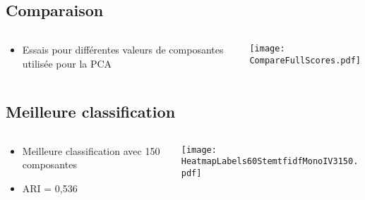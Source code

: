\documentclass[8pt,aspectratio=169,hyperref={unicode=true}]{beamer}
\begin{document}
\subsection{Comparaison}
\begin{frame}{\insertsubsection}
    \begin{columns}
        \begin{column}{.4\textwidth}
            \begin{itemize}
                \item Essais pour différentes valeurs de composantes utilisée pour la PCA
            \end{itemize}
        \end{column}
        \begin{column}{.6\textwidth}
            \texttt{[image: CompareFullScores.pdf]}
        \end{column}
    \end{columns}
\end{frame}

\subsection{Meilleure classification}
\begin{frame}{\insertsubsection}
    \begin{columns}
        \begin{column}{.4\textwidth}
            \begin{itemize}
                \item Meilleure classification avec 150 composantes
                \item ARI = 0,536
            \end{itemize}
        \end{column}
        \begin{column}{.6\textwidth}
            \texttt{[image: HeatmapLabels60StemtfidfMonoIV3150.pdf]}
        \end{column}
    \end{columns}
\end{frame}
\end{document}
